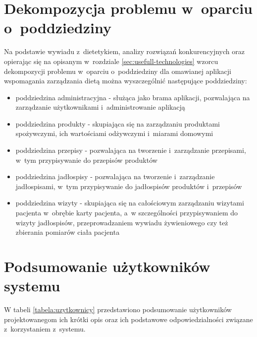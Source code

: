 \section{Dekompozycja problemu w~oparciu o~poddziedziny}\label{sec:problem-decomposition}
\par
Na podstawie wywiadu z~dietetykiem, analizy rozwiązań konkurencyjnych oraz opierając się
na opisanym w~rozdziale \ref{sec:usefull-technologies} wzorcu dekompozycji problemu w~oparciu o~poddziedziny
dla omawianej aplikacji wspomagania zarządzania dietą można wyszczególnić następujące poddziedziny:
\begin{itemize}
    \item poddziedzina administracyjna - służąca jako brama aplikacji, pozwalająca na zarządzanie użytkownikami i~administrowanie aplikacją
    \item poddziedzina produkty - skupiająca się na zarządzaniu produktami spożywczymi, ich wartościami odżywczymi i~miarami domowymi
    \item poddziedzina przepisy - pozwalająca na tworzenie i~zarządzanie przepisami, w~tym przypisywanie do przepisów produktów
    \item poddziedzina jadłospisy - pozwalająca na tworzenie i~zarządzanie jadłospisami, w~tym przypisywanie do jadłospisów produktów i~przepisów
    \item poddziedzina wizyty - skupiająca się na całościowym zarządzaniu wizytami pacjenta w~obrębie karty pacjenta, a~w szczególności przypisywaniem do wizyty jadłospisów, przeprowadzaniem wywiadu żywieniowego czy też zbierania pomiarów ciała pacjenta
\end{itemize}

\section{Podsumowanie użytkowników systemu}\label{sec:users-summary}
\par
W tabeli \ref{tabela:uzytkownicy} przedstawiono podsumowanie użytkowników projektowanegom ich krótki opis oraz ich podstawowe odpowiedzialności związane z~korzystaniem z~systemu.

